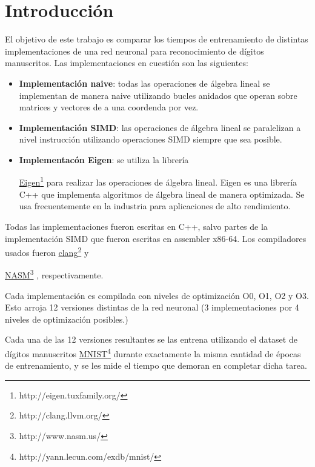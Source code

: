\documentclass[a4paper, 10pt, twoside]{article}
\newcommand{\link}[2]{
  \href{#1}{#2}\footnote{#1}
}
\begin{document}
\printindex




\section{Introducción}

El objetivo de este trabajo es comparar los tiempos de entrenamiento de
distintas implementaciones de una red neuronal para reconocimiento de dígitos
manuscritos. Las implementaciones en cuestión son las siguientes:

\begin{itemize}
  \item \textbf{Implementación naive}: todas las operaciones de álgebra lineal
    se implementan de manera naive utilizando bucles anidados que operan sobre
    matrices y vectores de a una coordenda por vez.

  \item \textbf{Implementación SIMD}: las operaciones de álgebra lineal se
    paralelizan a nivel instrucción utilizando operaciones SIMD siempre que sea
    posible.

  \item \textbf{Implementacón Eigen}: se utiliza la librería
    \link{http://eigen.tuxfamily.org/}{Eigen} para realizar las operaciones de
    álgebra lineal. Eigen es una librería C++ que implementa algoritmos de
    álgebra lineal de manera optimizada. Se usa frecuentemente en la industria
    para aplicaciones de alto rendimiento.
\end{itemize}

Todas las implementaciones fueron escritas en C++, salvo partes de la
implementación SIMD que fueron escritas en assembler x86-64. Los compiladores
usados fueron \link{http://clang.llvm.org/}{clang} y
\link{http://www.nasm.us/}{NASM}, respectivamente.

Cada implementación es compilada con niveles de optimización O0, O1, O2 y O3.
Esto arroja 12 versiones distintas de la red neuronal (3 implementaciones por 4
niveles de optimización posibles.)

Cada una de las 12 versiones resultantes se las entrena utilizando el dataset
de dígitos manuscritos \link{http://yann.lecun.com/exdb/mnist/}{MNIST} durante
exactamente la misma cantidad de épocas de entrenamiento, y se les mide el
tiempo que demoran en completar dicha tarea.
\end{document}
